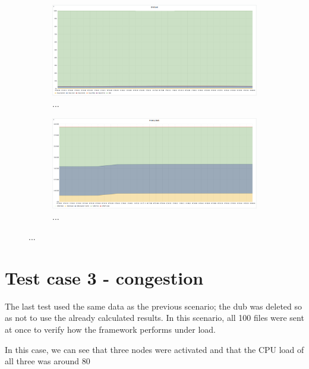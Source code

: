 \begin{figure}[H]
    \begin{subfigure}[h]{0.5\linewidth}
        \centering
        \includegraphics[width=1\linewidth]{other-fig/tests/burst_cached_cpu.png}
        \caption{...}
    \end{subfigure}
    \hfill
    \begin{subfigure}[h]{0.5\linewidth}
        \centering
        \includegraphics[width=1\linewidth]{other-fig/tests/burst_cached_ram.png}
        \caption{...}
    \end{subfigure}
    \caption{...}
\end{figure}

\section{Test case 3 - congestion}
The last test used the same data as the previous scenario; the dub was deleted so as not to use the already calculated results. In this scenario, all 100 files were sent at once to verify how the framework performs under load.

In this case, we can see that three nodes were activated and that the CPU load of all three was around 80 %


